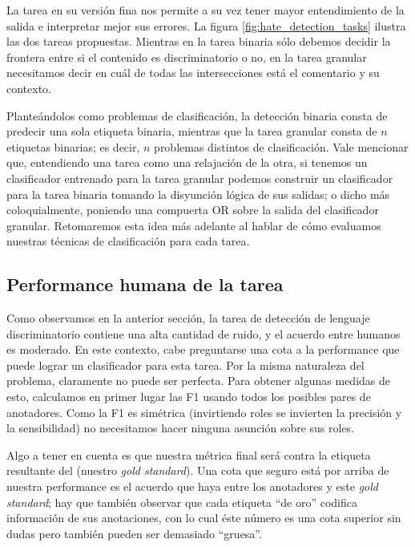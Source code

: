 La tarea en su versión fina nos permite a su vez tener mayor entendimiento de la salida e interpretar mejor sus errores. La figura \ref{fig:hate_detection_tasks} ilustra las dos tareas propuestas. Mientras en la tarea binaria sólo debemos decidir la frontera entre si el contenido es discriminatorio o no, en la tarea granular necesitamos decir en cuál de todas las intersecciones está el comentario y su contexto.

Planteándolos como problemas de clasificación, la detección binaria consta de predecir una sola etiqueta binaria, mientras que la tarea granular consta de $n$ etiquetas binarias; es decir, $n$ problemas distintos de clasificación. Vale mencionar que, entendiendo una tarea como una relajación de la otra, si tenemos un clasificador entrenado para la tarea granular podemos construir un clasificador para la tarea binaria tomando la disyunción lógica de sus salidas; o dicho más coloquialmente, poniendo una compuerta OR sobre la salida del clasificador granular. Retomaremos esta idea más adelante al hablar de cómo evaluamos nuestras técnicas de clasificación para cada tarea.




\subsection{Performance humana de la tarea}


Como observamos en la anterior sección, la tarea de detección de lenguaje discriminatorio contiene una alta cantidad de ruido, y el acuerdo entre humanos es moderado. En este contexto, cabe preguntarse una cota a la performance que puede lograr un clasificador para esta tarea. Por la misma naturaleza del problema, claramente no puede ser perfecta. Para obtener algunas medidas de esto, calculamos en primer lugar las F1 usando todos los posibles pares de anotadores. Como la F1 es simétrica (invirtiendo roles se invierten la precisión y la sensibilidad) no necesitamos hacer ninguna asunción sobre sus roles.

Algo a tener en cuenta es que nuestra métrica final será contra la etiqueta resultante del (nuestro \emph{gold standard}). Una cota que seguro está por arriba de nuestra performance es el acuerdo que haya entre los anotadores y este \emph{gold standard}; hay que también observar que cada etiqueta ``de oro'' codifica información de sus anotaciones, con lo cual éste número es una cota superior sin dudas pero también pueden ser demasiado ``gruesa''.

